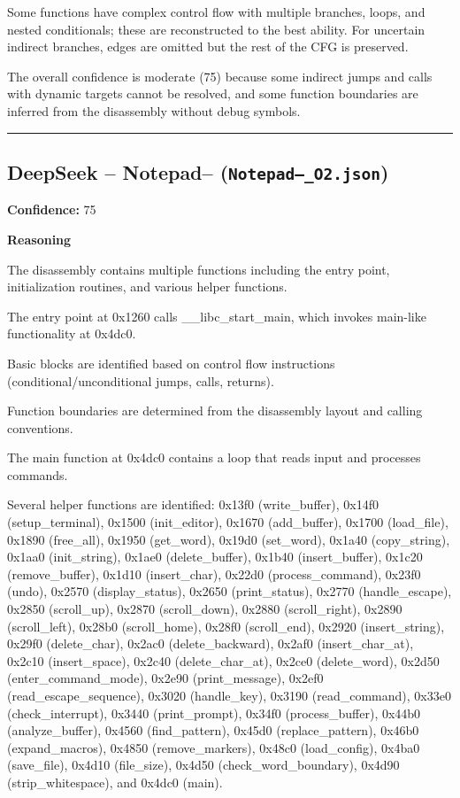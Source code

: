 Some functions have complex control flow with multiple branches, loops, and nested conditionals; these are reconstructed to the best ability. For uncertain indirect branches, edges are omitted but the rest of the CFG is preserved.

The overall confidence is moderate (75) because some indirect jumps and calls with dynamic targets cannot be resolved, and some function boundaries are inferred from the disassembly without debug symbols.

\bigskip
\hrule
\bigskip

\subsection{DeepSeek -- Notepad-- (\texttt{Notepad--\_O2.json})}

\textbf{Confidence:} 75

\textbf{Reasoning}

The disassembly contains multiple functions including the entry point, initialization routines, and various helper functions.

The entry point at 0x1260 calls \_\_libc\_start\_main, which invokes main-like functionality at 0x4dc0.

Basic blocks are identified based on control flow instructions (conditional/unconditional jumps, calls, returns).

Function boundaries are determined from the disassembly layout and calling conventions.

The main function at 0x4dc0 contains a loop that reads input and processes commands.

Several helper functions are identified: 0x13f0 (write\_buffer), 0x14f0 (setup\_terminal), 0x1500 (init\_editor), 0x1670 (add\_buffer), 0x1700 (load\_file), 0x1890 (free\_all), 0x1950 (get\_word), 0x19d0 (set\_word), 0x1a40 (copy\_string), 0x1aa0 (init\_string), 0x1ae0 (delete\_buffer), 0x1b40 (insert\_buffer), 0x1c20 (remove\_buffer), 0x1d10 (insert\_char), 0x22d0 (process\_command), 0x23f0 (undo), 0x2570 (display\_status), 0x2650 (print\_status), 0x2770 (handle\_escape), 0x2850 (scroll\_up), 0x2870 (scroll\_down), 0x2880 (scroll\_right), 0x2890 (scroll\_left), 0x28b0 (scroll\_home), 0x28f0 (scroll\_end), 0x2920 (insert\_string), 0x29f0 (delete\_char), 0x2ac0 (delete\_backward), 0x2af0 (insert\_char\_at), 0x2c10 (insert\_space), 0x2c40 (delete\_char\_at), 0x2ce0 (delete\_word), 0x2d50 (enter\_command\_mode), 0x2e90 (print\_message), 0x2ef0 (read\_escape\_sequence), 0x3020 (handle\_key), 0x3190 (read\_command), 0x33e0 (check\_interrupt), 0x3440 (print\_prompt), 0x34f0 (process\_buffer), 0x44b0 (analyze\_buffer), 0x4560 (find\_pattern), 0x45d0 (replace\_pattern), 0x46b0 (expand\_macros), 0x4850 (remove\_markers), 0x48c0 (load\_config), 0x4ba0 (save\_file), 0x4d10 (file\_size), 0x4d50 (check\_word\_boundary), 0x4d90 (strip\_whitespace), and 0x4dc0 (main).

